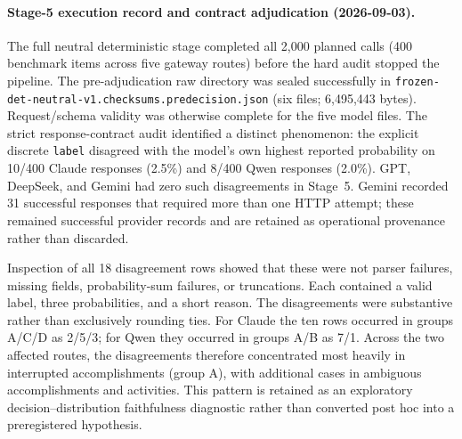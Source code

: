 
\paragraph{Stage-5 execution record and contract adjudication (2026-09-03).}
The full neutral deterministic stage completed all 2,000 planned calls (400 benchmark items across five gateway routes) before the hard audit stopped the pipeline. The pre-adjudication raw directory was sealed successfully in \texttt{frozen-det-neutral-v1.checksums.predecision.json} (six files; 6,495,443 bytes). Request/schema validity was otherwise complete for the five model files. The strict response-contract audit identified a distinct phenomenon: the explicit discrete \texttt{label} disagreed with the model's own highest reported probability on 10/400 Claude responses (2.5\%) and 8/400 Qwen responses (2.0\%). GPT, DeepSeek, and Gemini had zero such disagreements in Stage~5. Gemini recorded 31 successful responses that required more than one HTTP attempt; these remained successful provider records and are retained as operational provenance rather than discarded.

Inspection of all 18 disagreement rows showed that these were not parser failures, missing fields, probability-sum failures, or truncations. Each contained a valid label, three probabilities, and a short reason. The disagreements were substantive rather than exclusively rounding ties. For Claude the ten rows occurred in groups A/C/D as 2/5/3; for Qwen they occurred in groups A/B as 7/1. Across the two affected routes, the disagreements therefore concentrated most heavily in interrupted accomplishments (group A), with additional cases in ambiguous accomplishments and activities. This pattern is retained as an exploratory decision--distribution faithfulness diagnostic rather than converted post hoc into a preregistered hypothesis.

